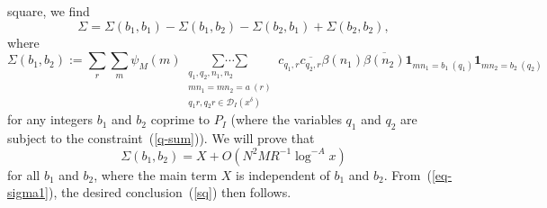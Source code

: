 \documentclass[12pt,a4paper,reqno]{amsart}
\numberwithin{equation}{section}
\theoremstyle{plain}
\theoremstyle{definition}
\newcommand{\DIone}[2]{\mathcal{D}_{{#1}}({#2})}
\newcommand\multsum{\mathop{\sum\cdots\sum}\limits}
\newcommand{\onef}{\mathbf{1}}
\begin{document}
square, we find
\begin{equation}\label{eq-sigma1}
\Sigma=\Sigma(b_1,b_1)-\Sigma(b_1,b_2)-\Sigma(b_2,b_1)+\Sigma(b_2,b_2),
\end{equation}
where
$$
\Sigma(b_1,b_2):=\sum_r \sum_{m} \psi_M(m)
\multsum_{\substack{q_1,q_2,n_1,n_2\\ mn_1=mn_2 = a\ (r)\\ q_1 r,q_2 r
    \in \DIone{I}{x^\delta}}} c_{q_1,r} \overline{c_{q_2,r}}
\beta(n_1) \overline{\beta(n_2)} \onef_{mn_1 = b_1\ (q_1)} \onef_{mn_2
  = b_2\ (q_2)}
$$
for any integers $b_1$ and $b_2$ coprime to $P_I$ (where the variables
$q_1$ and $q_2$ are subject to the constraint~(\ref{q-sum})). We will
prove that
\begin{equation}\label{sq2}
  \Sigma(b_1,b_2)= X + O( N^2 M R^{-1} \log^{-A} x )
\end{equation}
for all $b_1$ and $b_2$, where the main term $X$ is independent of
$b_1$ and $b_2$. From~(\ref{eq-sigma1}), the desired
conclusion~(\ref{sq}) then follows.
\end{document}
